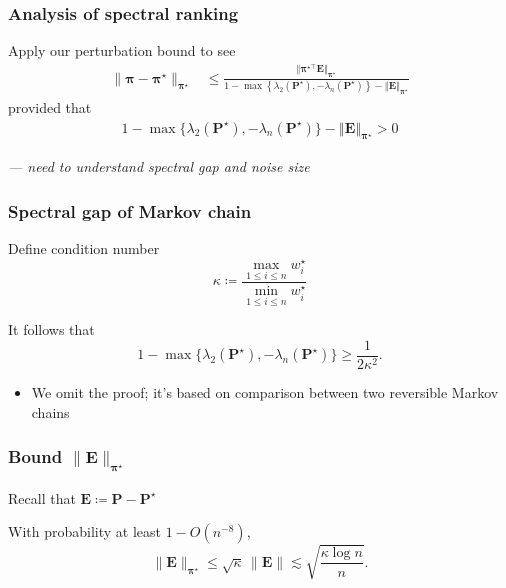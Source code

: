 \documentclass[compress,
mathserif,wide,%
]{beamer}
\begin{document}
\begin{frame}
	\frametitle{Analysis of spectral ranking}
	Apply our perturbation bound to see
	\begin{align}
	\|\bm{\pi}-\bm{\pi}^{\star}\|_{\bm{\pi}^{\star}}
	& \leq \frac{\big\Vert \bm{\pi}^{\star\top}\bm{E}\big\Vert _{\bm{\pi}^{\star}}}
	{1-\max\left\{ \lambda_{2}(\bm{P}^{\star}),-\lambda_{n}(\bm{P}^{\star})\right\} -\left\Vert \bm{E}\right\Vert _{\bm{\pi}^{\star}}} \nonumber
\end{align}
%
provided that
%
\begin{align}
	1-\max\big\{ \lambda_{2}(\bm{P}^{\star}),-\lambda_{n}(\bm{P}^{\star})\big\}
	-\left\Vert \bm{E}\right\Vert _{\bm{\pi}^{\star}} > 0
\end{align}

\pause 
\vfill
{\hfill \em --- need to understand spectral gap and noise size}
\end{frame}

\begin{frame}
	\frametitle{Spectral gap of Markov chain}
	Define condition number
	\begin{equation*}
	\kappa \coloneqq\frac{\max_{1\leq i\leq n}w_{i}^{\star}}{\min_{1\leq i\leq n}w_{i}^{\star}}
\end{equation*}
	\begin{lemma}
	\label{lemma:ranking-gap}
	It follows that
%
\[
1-\max\big\{ \lambda_{2}(\bm{P}^{\star}),-\lambda_{n}(\bm{P}^{\star}) \big\} \geq\frac{1}{2\kappa^{2}}.
\]
\end{lemma}

\vfill

\begin{itemize}
	\item We omit the proof; it's based on comparison between two reversible Markov chains
\end{itemize}
\end{frame}

\begin{frame}
	\frametitle{Bound $\|\bm{E}\|_{\bm{\pi}^\star}$}
	Recall that $\bm{E}\coloneqq\bm{P}-\bm{P}^{\star}$
	
	\vfill
\begin{lemma}
	\label{lemma:ranking-noise}

With probability at least $1-O(n^{-8})$,
%
\[
	\|\bm{E}\|_{\bm{\pi}^{\star}}\leq \sqrt{\kappa}\,\|\bm{E}\| \lesssim\sqrt{\frac{\kappa\log n}{n}}.
\]
%
\end{lemma}
\end{frame}
\end{document}
